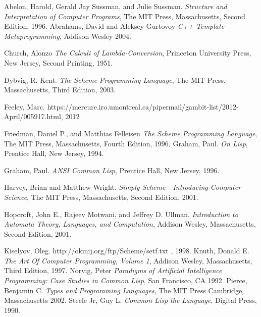  
\begin{thebibliography}{9}

  Abelon, Harold, Gerald Jay Sussman, and Julie Sussman.
  \emph{Structure and Interpretation of Computer Programs},
  The MIT Press, Massachusetts,
  Second Edition,
  1996.
  Abrahams, David and Aleksey Gurtovoy
  \emph{C++ Template Metaprogramming},
  Addison Wesley
  2004.

  Church, Alonzo
  \emph{The Calculi of Lambda-Conversion},
  Princeton University Press, New Jersey,
  Second Printing,
  1951.

  Dybvig, R. Kent.
  \emph{The Scheme Programming Language},
  The MIT Press, Massachusetts,
  Third Edition,
  2003.

  Feeley, Marc. https://mercure.iro.umontreal.ca/pipermail/gambit-list/2012-April/005917.html, 2012

  Friedman, Daniel P., and Matthias Felleisen
  \emph{The Scheme Programming Language},
  The MIT Press, Massachusetts,
  Fourth Edition,
  1996.
  Graham, Paul.
  \emph{On Lisp},
  Prentice Hall, New Jersey,
  1994.

  Graham, Paul.
  \emph{ANSI Common Lisp},
  Prentice Hall, New Jersey,
  1996.

  Harvey, Brian and Matthew Wright.
  \emph{Simply Scheme - Introducing Computer Science},
  The MIT Press, Massachusetts,
  Second Edition,
  2001.

  Hopcroft, John E., Rajeev Motwani, and Jeffrey D. Ullman.
  \emph{Introduction to Automata Theory, Languages, and Computation},
  Addison Wesley, Massachusetts,
  Second Edition,
  2001.

  Kiselyov, Oleg. http://okmij.org/ftp/Scheme/setf.txt , 1998.
  Knuth, Donald E.
  \emph{The Art Of Computer Programming, Volume 1},
  Addison Wesley, Massachusetts,
  Third Edition,
  1997.
  Norvig, Peter
  \emph{Paradigms of Artificial Intelligence Programming: Case Studies in Common Lisp},
  San Francisco, CA
  1992.
  Pierce, Benjamin C.
  \emph{Types and Programming Languages},
  The MIT Press
  Cambridge, Massachusetts
  2002.
  Steele Jr, Guy L.
  \emph{Common Lisp the Language},
  Digital Press,
  1990.




\end{thebibliography}
 \printindex

